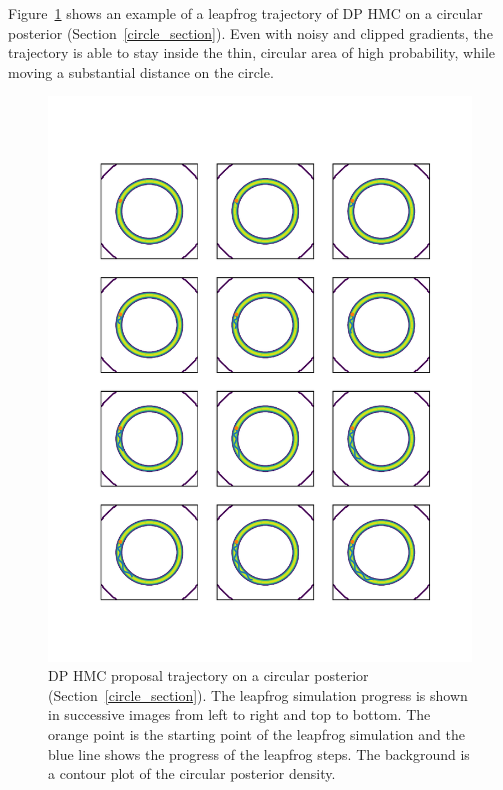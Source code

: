 \documentclass[english,twoside,openright]{HYgraduMLDS}
\begin{document}
Figure~\ref{hmc_trajectory_fig} shows an example of a leapfrog trajectory
of DP HMC on a circular posterior (Section~\ref{circle_section}).
Even with noisy and clipped gradients,
the trajectory is able to stay inside the thin, circular area of high probability,
while moving a substantial distance on the circle.

\begin{figure}
	\centering
  \includegraphics[width=\textwidth]{figures/hmc_trajectory}
  \caption{
    DP HMC proposal trajectory on a circular posterior
    (Section~\ref{circle_section}). The leapfrog simulation progress is shown
    in successive images from left to right and top to bottom.
    The orange point is the starting
    point of the leapfrog simulation and the blue line shows the progress
    of the leapfrog steps. The background is a contour plot of the circular
    posterior density.
  }
  \label{hmc_trajectory_fig}
\end{figure}
\end{document}
